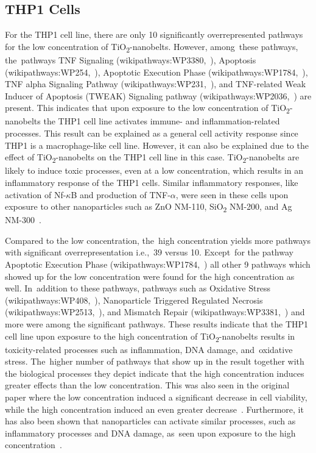 \documentclass[ijms,article,accept,moreauthors,pdftex]{Definitions/mdpi}
\begin{document}
\begin{paracol}{2}
\subsection{THP1 Cells}
For the THP1 cell line, there are only 10 significantly overrepresented pathways for the low concentration of TiO\textsubscript{2}-nanobelts. However, among~these pathways, the~pathways TNF Signaling (wikipathways:WP3380,~\cite{WP3380}), Apoptosis (wikipathways:WP254,~\cite{WP254}), Apoptotic Execution Phase (wikipathways:WP1784,~\cite{WP1784}), TNF alpha Signaling Pathway (wikipathways:WP231,~\cite{WP231}), and TNF-related Weak Inducer of Apoptosis (TWEAK) Signaling pathway (wikipathways:WP2036,~\cite{WP2036}) are present. This indicates that upon exposure to the low concentration of TiO\textsubscript{2}-nanobelts the THP1 cell line activates immune- and inflammation-related processes. This result can be explained as a general cell activity response since THP1 is a macrophage-like cell line. However, it can also be explained due to the effect of TiO\textsubscript{2}-nanobelts on the THP1 cell line in this case. TiO\textsubscript{2}-nanobelts are likely to induce toxic processes, even at a low concentration, which results in an inflammatory response of the THP1 cells. Similar inflammatory responses, like activation of Nf-$\kappa$B and production of TNF-$\alpha$, were seen in these cells upon exposure to other nanoparticles such as ZnO NM-110, SiO\textsubscript{2} NM-200, and Ag NM-300~\cite{Brzicova2019}. 

Compared to the low concentration, the~high concentration yields more pathways with significant overrepresentation i.e.,~39 versus 10. Except~for the pathway Apoptotic Execution Phase (wikipathways:WP1784,~\cite{WP1784}) all other 9 pathways which showed up for the low concentration were found for the high concentration as well. In~addition to these pathways, pathways such as Oxidative Stress (wikipathways:WP408,~\cite{WP408}), Nanoparticle Triggered Regulated Necrosis (wikipathways:WP2513,~\cite{WP2513}), and Mismatch Repair (wikipathways:WP3381,~\cite{WP3381}) %
and more were among the significant pathways. These results indicate that the THP1 cell line upon exposure to the high concentration of TiO\textsubscript{2}-nanobelts results in toxicity-related processes such as inflammation, DNA damage, and~oxidative stress. The~higher number of pathways that show up in the result together with the biological processes they depict indicate that the high concentration induces greater effects than the low concentration. This was also seen in the original paper where the low concentration induced a significant decrease in cell viability, while the high concentration induced an even greater decrease~\cite{Tilton2013}. Furthermore, it has also been shown that nanoparticles can activate similar processes, such as inflammatory processes and DNA damage, as~seen upon exposure to the high concentration~\cite{Brzicova2019,Huang2017}.


\end{paracol}
\end{document}

